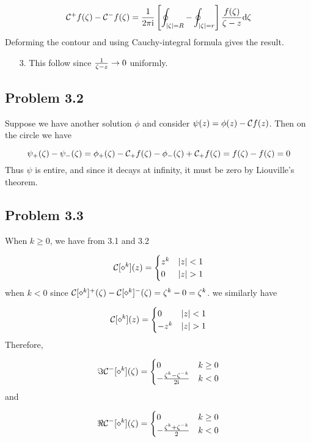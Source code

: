 \documentclass[12pt,landscape]{article}
\def\D{ {\rm d} }
\def\I{ {\rm i} }
\def\CC{ {\cal C} }
\begin{document}
{\[
\CC^+ f(\zeta) - \CC^- f(\zeta) = {1 \over 2 \pi \I} \left[\oint_{|\zeta| = R} - \oint_{|\zeta| = r} \right] {f(\zeta) \over \zeta -z} \D\zeta
\]
Deforming the contour and using Cauchy-integral formula gives the result.

\begin{itemize}
\item[3. ] This follow since ${1 \over \zeta - z} \rightarrow 0$ uniformly.

\end{itemize}
\subsection{Problem 3.2}
Suppose we have another solution $\phi$ and consider $\psi(z) = \phi(z) - \CC f(z)$. Then on the circle we have

\[
\psi_+(\zeta) - \psi_-(\zeta) = \phi_+(\zeta) - \CC_+f(\zeta) - \phi_-(\zeta) + \CC_+f(\zeta) = f(\zeta)-f(\zeta) = 0
\]
Thus $\psi$ is entire, and since it decays at infinity, it must be zero by Liouville's theorem.
\newpage
\subsection{Problem 3.3}
When $k \geq 0$, we have from 3.1 and 3.2

\[
\CC[\diamond^k](z) =\begin{cases}
    z^k  & |z| < 1 \\
    0 & |z| > 1
    \end{cases}
\]
when $k < 0$ since $\CC[\diamond^k]^+(\zeta) - \CC[\diamond^k]^-(\zeta) = \zeta^k - 0 = \zeta^k$. we similarly have

\[
\CC[\diamond^k](z) =\begin{cases}
0  & |z| < 1 \\
    -z^k & |z| > 1
        \end{cases}
\]
Therefore,

\[
\Im \CC^-[\diamond^k](\zeta) =\begin{cases}
0  & k \geq 0 \\
    -{\zeta^k - \zeta^{-k} \over 2 \I} & k < 0
        \end{cases}
\]
and

\[
\Re \CC^-[\diamond^k](\zeta) =\begin{cases}
0  & k \geq 0 \\
    -{\zeta^k + \zeta^{-k} \over 2} & k < 0
        \end{cases}
\]
\newpage
\hfill \\
\newpage
}
\end{document}

